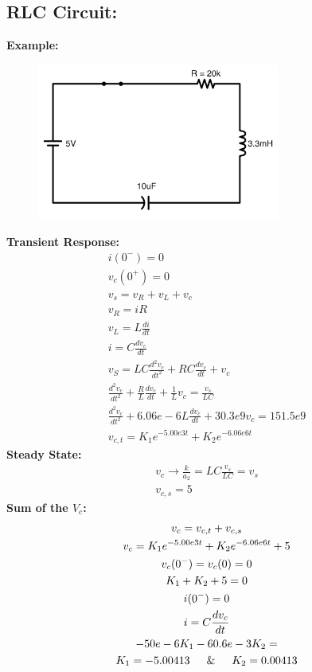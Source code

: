 \documentclass[a4paper,12]{article}
\begin{document}
\subsection{RLC Circuit:}
\textbf{Example:}
\begin{figure}[H]
    \centering
    \includegraphics[width=80mm]{Image/25.jpeg}
\end{figure}
\textbf{Transient Response:}
\begin{gather}
    i(0^-)=0\\
    v_c(0^+)=0\\
    v_s=v_R+v_L+v_c\\
    v_R=iR\\
    v_L=L\frac{di}{dt}\\
    i=C\frac{dv_c}{dt}\\
    v_S=LC\frac{d^2v_c}{dt^2}+RC\frac{dv_c}{dt}+v_c\\
    \frac{d^2v_c}{dt^2}+\frac{R}{L}\frac{dv_c}{dt}+\frac{1}{L}v_c=\frac{v_s}{LC}\\
    \frac{d^2v_c}{dt^2}+6.06e-6{L}\frac{dv_c}{dt}+30.3e9v_c=151.5e9\\
    v_{c,t}=K_1e^{-5.00e3t}+K_2e^{-6.06e6t}
\end{gather}
\textbf{Steady State:}
\begin{gather}
    v_c\rightarrow \frac{k}{a_2}=LC\frac{v_s}{LC}=v_s\\
    v_{c,s}=5
\end{gather}
\textbf{Sum of the $V_c$:}
\begin{gather}
v_c=v_{c,t}+v_{c,s}\\
v_c=K_1e^{-5.00e3t}+K_2e^{-6.06e6t}+5\\
v_c(0^-)=v_c(0)=0\\
K_1+K_2+5=0\\
i(0^-)=0\\
i=C\frac{dv_c}{dt}\\
-50e-6K_1-60.6e-3K_2=\\
K_1=-5.00413 \indent \& \indent K_2=0.00413
\end{gather}
\end{document}
